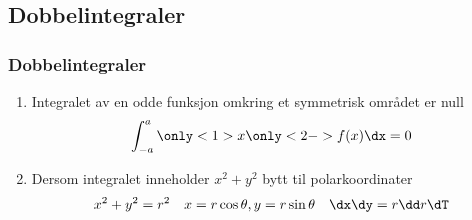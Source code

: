 \begin{frame}
  \subsection{Dobbelintegraler}\label{subsec:Dobbelintegraler}
  \frametitle{Dobbelintegraler}
  \begin{enumerate}
    \item Integralet av en odde funksjon omkring et symmetrisk området er null
      \begin{equation*}
        \int_{-a}^{a} \only<1>{x}\only<2->{f(x)} \dx = 0
      \end{equation*}
    \item Dersom integralet inneholder $x^2 + y^2$ bytt til polarkoordinater
      \begin{equation*}
        x^2 + y^2 = r^2 \quad x = r \cos \theta, y = r \sin \theta \quad \dx \dy = r \dd r \dT 
      \end{equation*}
      
  \end{enumerate}
\end{frame}

